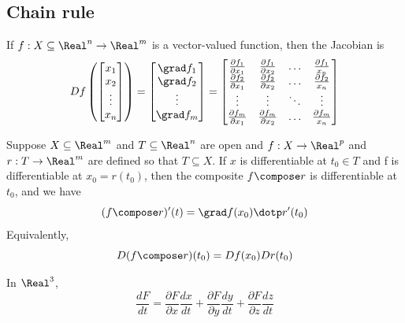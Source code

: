 \subsection{Chain rule}


\begin{definition}[Jacobian]
  If $f: X \subseteq \Real^n \to \Real^m$ is a vector-valued function, then the Jacobian is
  \[
    Df\left(\begin{bmatrix}
      x_1 \\
      x_2 \\
      \vdots \\
      x_n
    \end{bmatrix}\right) = \begin{bmatrix}
      \grad f_1 \\
      \grad f_2 \\
      \vdots \\
      \grad f_m
    \end{bmatrix} = \begin{bmatrix}
      \frac{\partial f_1}{\partial x_1} & \frac{\partial f_1}{\partial x_2} & \hdots & \frac{\partial f_1}{x_n} \\
      \frac{\partial f_2}{\partial x_1} & \frac{\partial f_2}{\partial x_2} & \hdots & \frac{\partial f_2}{x_n} \\
      \vdots & \vdots & \ddots & \vdots \\
      \frac{\partial f_m}{\partial x_1} & \frac{\partial f_m}{\partial x_2} & \hdots & \frac{\partial f_m}{x_n} \\
    \end{bmatrix}
  \]
\end{definition}

\begin{theorem}
  Suppose $X \subseteq \Real^m$ and $T \subseteq \Real^n$ are open and $f : X \to \Real^p$ and
  $r : T \to \Real^m$ are defined so that $T \subseteq X$. If $x$ is
  differentiable at $t_0 \in T$ and f is differentiable at $x_0 = r(t_0)$, then
  the composite $f \compose r$ is differentiable at $t_0$, and we have
  \[
    (f \compose r)'(t) = \grad f(x_0) \dotp r'(t_0)
  \]
  Equivalently,
  \[
    D(f \compose r)(t_0) = Df(x_0) Dr(t_0)
  \]

  In $\Real^3$,
  \[
    \frac{dF}{dt} = \frac{\partial F}{\partial x} \frac{dx}{dt} + \frac{\partial F}{\partial y} \frac{dy}{dt} + \frac{\partial F}{\partial z} \frac{dz}{dt}
  \]
\end{theorem}

